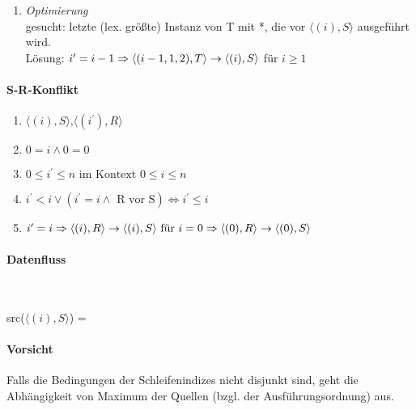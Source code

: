 \begin{enumerate}
\item \textit{Optimierung}\\
    gesucht: letzte (lex. größte) Instanz von T mit *, die vor $\langle (i), S \rangle$ ausgeführt wird. \\
    Lösung: $i^\prime = i-1\\
            \Rightarrow \langle (i-1,1,2), T \rangle \rightarrow \langle (i), S \rangle$ für $i \geq 1$
\end{enumerate}

\paragraph{S-R-Konflikt}
\begin{enumerate}
    \item $\langle (i), S \rangle \text{,} \langle(i^\prime), R \rangle$
    \item $0=i \land 0 = 0$
    \item $0 \leq i^\prime \leq n \text{ im Kontext } 0 \leq i \leq n$
    \item $i^\prime < i \lor (i^\prime = i \land \text{ R vor S}) \Leftrightarrow i^\prime \leq i$
    \item $i^\prime = i \\
        \Rightarrow \langle (i),R \rangle \rightarrow \langle (i), S \rangle \text{ für } i=0 \\
        \Rightarrow \langle (0),R \rangle \rightarrow \langle (0), S \rangle$
\end{enumerate}

\paragraph{Datenfluss}~\\
\begin{procedure}
    src($ \langle (i), S \rangle $) =\\ 
\end{procedure}

\paragraph{Vorsicht} Falls die Bedingungen der Schleifenindizes nicht disjunkt sind, geht die Abhängigkeit von Maximum der Quellen (bzgl. der Ausführungsordnung) aus.
